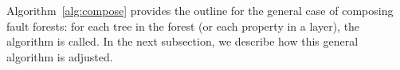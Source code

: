 Algorithm~\ref{alg:compose} provides the outline for the general case of composing fault forests: for each tree in the forest (or each property in a layer), the algorithm is called. In the next subsection, we describe how this general algorithm is adjusted.

